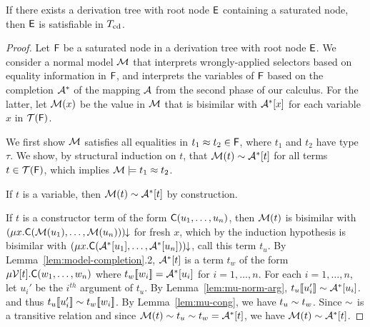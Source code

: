 \begin{lemma}%
\label{lem:ss}%
\afterDot
If there exists a derivation tree with root node $\mathsf{E}$ containing a saturated node, then $\mathsf{E}$ is satisfiable in $T_{\mathrm{cd}}$.
\end{lemma}
\begin{proof}
Let $\mathsf{F}$ be a saturated node in a derivation tree with root node $\mathsf{E}$.
We consider a normal model $\mathcal{M}$ 
that interprets wrongly-applied selectors based on equality information in $\mathsf{F}$,
and interprets the variables of $\mathsf{F}$ based on the completion $\mathcal{A}^\ast$ of the mapping $\mathcal{A}$ from the second phase of our calculus.
For the latter, let $\mathcal{M}( x )$ be the value in $\mathcal{M}$ that is bisimilar with $\mathcal{A}^\ast [ x ]$ for each variable $x$ in $\mathcal{T}(\mathsf{F})$.

We first show $\mathcal{M}$ satisfies all equalities in $t_1 \approx t_2 \in \mathsf{F}$, where $t_1$ and $t_2$ have type $\tau$.
We show,
by structural induction on $t$,
that $\mathcal{M}( t ) \sim \mathcal{A}^\ast [ t ]$ for all terms $t \in \mathcal{T}( \mathsf{F} )$,
which implies $\mathcal{M} \models t_1 \approx t_2$.

If $t$ is a variable, then $\mathcal{M}( t ) \sim \mathcal{A}^\ast [  t  ]$ by construction.

If $t$ is a constructor term of the form $\textsf{C}( u_1, \ldots, u_n )$, 
then $\mathcal{M}( t )$ is bisimilar with ${(\mu x. \textsf{C}( \mathcal{M}( u_1 ), \ldots, \mathcal{M}( u_n ) ) )}\!\!\downarrow$ for fresh $x$,
which by the induction hypothesis is bisimilar with ${(\mu x. \textsf{C}( \mathcal{A}^\ast [  u_1  ], \ldots, \mathcal{A}^\ast [  u_n  ] ) )}\!\!\downarrow$, call this term $t_u$.
By Lemma~\ref{lem:model-completion}.2, $\mathcal{A}^\ast [ t ]$ is a term
$t_w$ of the form $\mu \mathcal{V}{[ t ]}. \textsf{C}( w_1, \ldots, w_n )$
where $t_w[\![ w_i ]\!] = \mathcal{A}^\ast [ u_i ]$ for $i = 1, \ldots, n$.
For each $i = 1, \ldots, n$, let $u_i'$ be the $i^{th}$ argument of $t_u$.
By Lemma~\ref{lem:mu-norm-arg}, $t_u[\![ u_i' ]\!] \sim \mathcal{A}^\ast [ u_i ]$.
and thus $t_u[\![ u_i' ]\!] \sim t_w[\![  w_i  ]\!]$. %
By Lemma~\ref{lem:mu-cong}, we have $t_u \sim t_w$.
Since $\sim$ is a transitive relation and since $\mathcal{M}( t ) \sim t_u \sim t_w = \mathcal{A}^\ast [ t ]$,
we have $\mathcal{M}( t ) \sim \mathcal{A}^\ast [ t ]$.


\end{proof}
